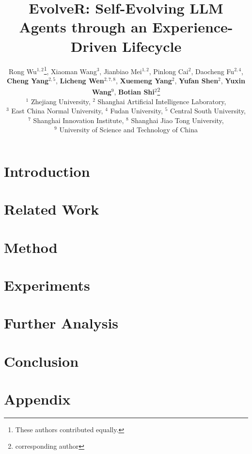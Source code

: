 \documentclass{article} %
\title{EvolveR: Self-Evolving LLM Agents through an Experience-Driven Lifecycle}
\author{
Rong Wu$^{1,2}$\thanks{These authors contributed equally.}, Xiaoman Wang$^{3}$\footnotemark[1], Jianbiao Mei$^{1,2}$, Pinlong Cai$^{2}$, Daocheng Fu$^{2,4}$, \\ \textbf{Cheng Yang}$^{2,5}$, 
\textbf{Licheng Wen}$^{2,7,8}$, \textbf{Xuemeng Yang}$^{2}$, \textbf{Yufan Shen}$^{2}$, \textbf{Yuxin Wang}$^{9}$, \textbf{Botian Shi}$^{2}$\thanks{corresponding author} \vspace{7pt} \\
$^{1}$ Zhejiang University, $^{2}$ Shanghai Artificial Intelligence Laboratory, \\ $^{3}$ East China Normal University, $^{4}$ Fudan University, $^{5}$ Central South University, \\ $^{7}$ Shanghai Innovation Institute,
$^{8}$ Shanghai Jiao Tong University,  \\ $^{9}$ University of Science and Technology of China
}
\begin{document}
\maketitle

\begin{abstract}

\end{abstract}

\section{Introduction}


\section{Related Work}


\section{Method}


\section{Experiments}


\section{Further Analysis}


\section{Conclusion}




\newpage

% 


\newpage
\appendix
\section{Appendix}

\end{document}
